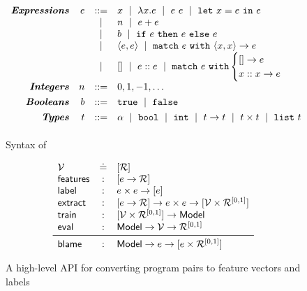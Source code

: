 \begin{figure}[t]
$$
\begin{array}{rrcl}
\emphbf{Expressions}
  & e & ::=    & x \spmid \efun{x}{e} \spmid \eapp{e}{e} \spmid \elet{x}{e}{e} \\
  &   & \spmid & n \spmid \eplus{e}{e}\\
  &   & \spmid & b \spmid \eif{e}{e}{e} \\
  &   & \spmid & \epair{e}{e} \spmid \epcase{e}{x}{x}{e} \\
  &   & \spmid & \enil \spmid \econs{e}{e} \spmid \ecase{e}{e}{x}{x}{e} \\[0.05in]

\emphbf{Integers}
  & n & ::= &  0, 1, -1, \ldots \\[0.05in]

\emphbf{Booleans}
  & b & ::= &  \etrue \spmid \efalse \\[0.05in]

\emphbf{Types}
  & t & ::= & \alpha \spmid \tbool \spmid \tint \spmid \tfun{t}{t} \spmid \tprod{t}{t} \spmid \tlist{t} \\[0.05in]
\end{array}
$$
\caption{Syntax of \lang}
\label{fig:syntax}
\end{figure}

\begin{figure}[t]
\centering
$$
\begin{array}{lcl}
  \V          & \defeq & \List{\R}\\

  \featuresym & : & \List{e \to \R} \\
  \labelsym   & : & e \times e \to \List{e} \\
  \extractsym & : & \List{e \to \R} \to e \times e \to \List{\V \times \Runit} \\
  \trainsym   & : & \List{\V \times \B} \to \Model \\
  \evalsym    & : & \Model \to \V \to \Runit \\
  \midrule
  \blamesym   & : & \Model \to e \to \List{e \times \Runit}
\end{array}
$$
\caption{A high-level API for converting program pairs to feature vectors and labels}
\label{fig:api}
\end{figure}
